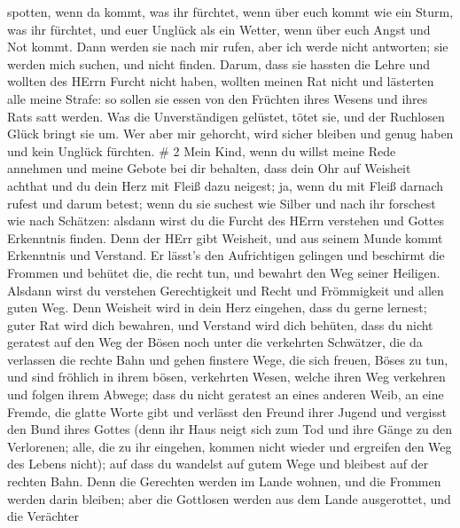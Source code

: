 spotten, wenn da kommt, was ihr fürchtet,  wenn über euch
kommt wie ein Sturm, was ihr fürchtet, und euer Unglück als ein Wetter,
wenn über euch Angst und Not kommt.  Dann werden sie nach
mir rufen, aber ich werde nicht antworten; sie werden mich suchen, und
nicht finden.  Darum, dass sie hassten die Lehre und
wollten des HErrn Furcht nicht haben,  wollten meinen Rat
nicht und lästerten alle meine Strafe:  so sollen sie essen
von den Früchten ihres Wesens und ihres Rats satt werden. 
Was die Unverständigen gelüstet, tötet sie, und der Ruchlosen Glück
bringt sie um.  Wer aber mir gehorcht, wird sicher bleiben
und genug haben und kein Unglück fürchten. \# 2  Mein Kind,
wenn du willst meine Rede annehmen und meine Gebote bei dir behalten,
 dass dein Ohr auf Weisheit achthat und du dein Herz mit
Fleiß dazu neigest;  ja, wenn du mit Fleiß darnach rufest
und darum betest;  wenn du sie suchest wie Silber und nach
ihr forschest wie nach Schätzen:  alsdann wirst du die
Furcht des HErrn verstehen und Gottes Erkenntnis finden. 
Denn der HErr gibt Weisheit, und aus seinem Munde kommt Erkenntnis und
Verstand.  Er lässt's den Aufrichtigen gelingen und
beschirmt die Frommen  und behütet die, die recht tun, und
bewahrt den Weg seiner Heiligen.  Alsdann wirst du verstehen
Gerechtigkeit und Recht und Frömmigkeit und allen guten Weg.
 Denn Weisheit wird in dein Herz eingehen, dass du gerne
lernest;  guter Rat wird dich bewahren, und Verstand wird
dich behüten,  dass du nicht geratest auf den Weg der Bösen
noch unter die verkehrten Schwätzer,  die da verlassen die
rechte Bahn und gehen finstere Wege,  die sich freuen,
Böses zu tun, und sind fröhlich in ihrem bösen, verkehrten Wesen,
 welche ihren Weg verkehren und folgen ihrem Abwege;
 dass du nicht geratest an eines anderen Weib, an eine
Fremde, die glatte Worte gibt  und verlässt den Freund
ihrer Jugend und vergisst den Bund ihres Gottes  (denn ihr
Haus neigt sich zum Tod und ihre Gänge zu den Verlorenen; 
alle, die zu ihr eingehen, kommen nicht wieder und ergreifen den Weg des
Lebens nicht);  auf dass du wandelst auf gutem Wege und
bleibest auf der rechten Bahn.  Denn die Gerechten werden
im Lande wohnen, und die Frommen werden darin bleiben; 
aber die Gottlosen werden aus dem Lande ausgerottet, und die Verächter
